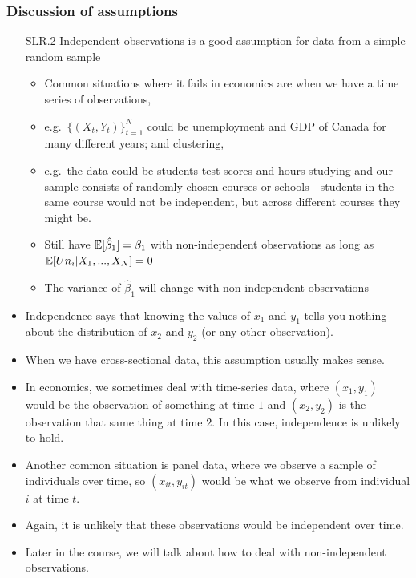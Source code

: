 \begin{frame}[allowframebreaks]
  \frametitle{Discussion of assumptions}
  \begin{itemize}
  \item[SLR.2] Independent observations is a good assumption for data
    from a simple random sample
    \begin{itemize}
    \item Common situations where it fails in
      economics are when we have a time series of observations,
      \item e.g.\ $\{(X_t,Y_t)\}_{t=1}^N$ could be unemployment and GDP of
      Canada for many different years; and clustering, 
      \item e.g.\ the data
      could be students test scores and hours studying and our sample
      consists of randomly chosen courses or schools---students in the
      same course would not be independent, but across different courses
      they might be.
    \item Still have $\mathbb{E}[\hat{\beta}_1] = \beta_1$ with
      non-independent observations as long as $\mathbb{E}[Un_i | X_1, ..., X_N] = 0$
    \item The variance of $\hat{\beta}_1$ will change with
      non-independent observations
    \end{itemize}
 
\item Independence says that knowing the values of $x_1$ and $y_1$ tells you
nothing about the distribution of $x_2$ and $y_2$ (or any other
observation).
\item  When we have cross-sectional data, this assumption
usually makes sense. 
\item In economics, we sometimes deal with time-series
data, where $(x_1,y_1)$ would be the observation of something at time
$1$ and $(x_2,y_2)$ is the observation that same thing at time $2$. In
this case, independence is unlikely to hold. 
\item Another common situation
is panel data, where we observe a sample of individuals over time, so
$(x_{it}, y_{it})$ would be what we observe from individual $i$ at
time $t$. 
\item Again, it is unlikely that these observations would be
independent over time.  
\item Later in the course, we will talk about how to
deal with non-independent observations.
\end{itemize}
\end{frame}

